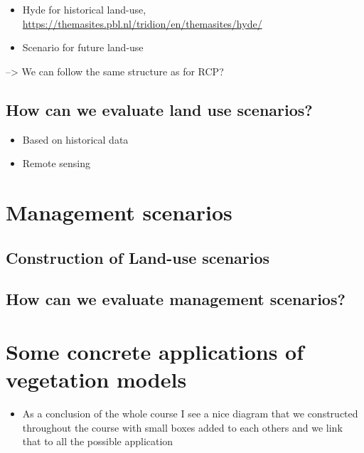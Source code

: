 \documentclass[oneside]{book}
\providecommand{\tightlist}{%
  \setlength{\itemsep}{0pt}\setlength{\parskip}{0pt}}
\begin{document}
\begin{itemize}
\tightlist
\item
  Hyde for historical land-use,
  \url{https://themasites.pbl.nl/tridion/en/themasites/hyde/}
\item
  Scenario for future land-use
\end{itemize}

--\textgreater{} We can follow the same structure as for RCP?

\subsection{How can we evaluate land use
scenarios?}\label{how-can-we-evaluate-land-use-scenarios}

\begin{itemize}
\tightlist
\item
  Based on historical data
\item
  Remote sensing
\end{itemize}

\section{Management scenarios}\label{management-scenarios}

\subsection{Construction of Land-use
scenarios}\label{construction-of-land-use-scenarios-1}

\subsection{How can we evaluate management
scenarios?}\label{how-can-we-evaluate-management-scenarios}

\section{Some concrete applications of vegetation
models}\label{some-concrete-applications-of-vegetation-models}

\begin{itemize}
\tightlist
\item
  As a conclusion of the whole course I see a nice diagram that we
  constructed throughout the course with small boxes added to each
  others and we link that to all the possible application
\end{itemize}
\end{document}
